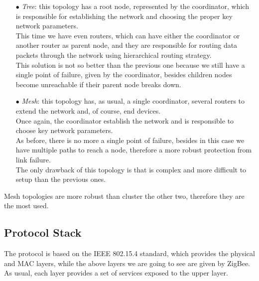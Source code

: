 \documentclass[12pt]{report}
\begin{document}
{{\begin{itemize}
\item[$\bullet$] \emph{Tree}: this topology has a root node, represented by the coordinator, which is responsible for establishing the network and choosing the proper key network parameters.\\
This time we have even routers, which can have either the coordinator or another router as parent node, and they are responsible for routing data packets through the network using hierarchical routing strategy.\\
This solution is not so better than the previous one because we still have a single point of failure, given by the coordinator, besides children nodes become unreachable if their parent node breaks down.

\item[$\bullet$] \emph{Mesh}: this topology has, as usual, a single coordinator, several routers to extend the network and, of course, end devices.\\
Once again, the coordinator establish the network and is responsible to choose key network parameters.\\
As before, there is no more a single point of failure, besides in this case we have multiple paths to reach a node, therefore a more robust protection from link failure.\\
The only drawback of this topology is that is complex and more difficult to setup than the previous ones.\\
\end{itemize}

Mesh topologies are more robust than cluster the other two, therefore they are the most used.\\

\clearpage
\subsection{Protocol Stack}
\bigskip

The protocol is based on the IEEE 802.15.4 standard, which provides the physical and MAC layers, while the above layers we are going to see are given by ZigBee.
As usual, each layer provides a set of services exposed to the upper layer.\\

}}
\end{document}
